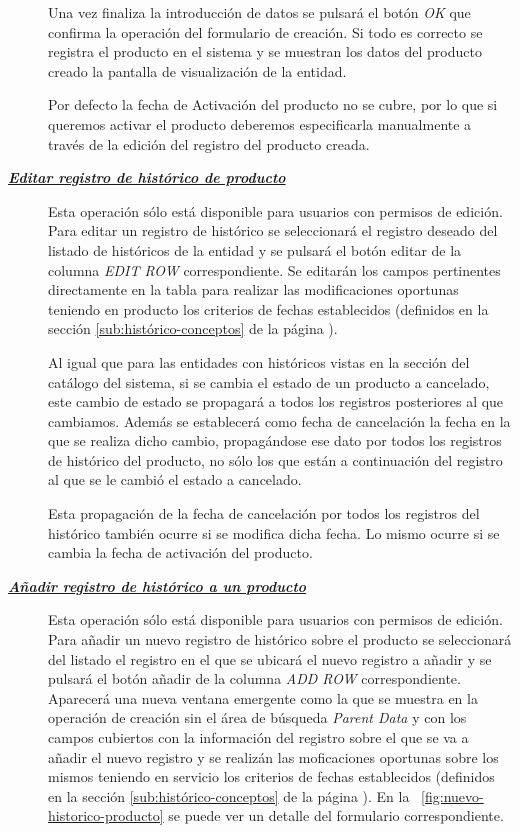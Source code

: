\begin{description}
Una vez finaliza la introducción de datos se pulsará el botón \emph{OK} que confirma la operación del formulario de creación. Si todo es correcto se registra el producto en el sistema y se muestran los datos del producto creado la pantalla de visualización de la entidad.

Por defecto la fecha de Activación del producto no se cubre, por lo que si queremos activar el producto deberemos especificarla manualmente a través de la edición del registro del producto creada.


\item[\underline{\textsl{\textbf{Editar registro de histórico de producto}}}] Esta operación sólo está disponible para usuarios con permisos de edición.
Para editar un registro de histórico se seleccionará el registro deseado del listado de históricos de la entidad y se pulsará el botón editar de la columna \textit{EDIT ROW} correspondiente. Se editarán los campos pertinentes directamente en la tabla para realizar las modificaciones oportunas teniendo en producto los criterios de fechas establecidos (definidos en la sección \ref{sub:histórico-conceptos} de la página \pageref{sub:histórico-conceptos}).

Al igual que para las entidades con históricos vistas en la sección del catálogo del sistema, si se cambia el estado de un producto a cancelado, este cambio de estado se propagará a todos los registros posteriores al que cambiamos. Además se establecerá como fecha de cancelación la fecha en la que se realiza dicho cambio, propagándose ese dato por todos los registros de histórico del producto, no sólo los que están a continuación del registro al que se le cambió el estado a cancelado.

Esta propagación de la fecha de cancelación por todos los registros del histórico  también ocurre si se modifica dicha fecha. Lo mismo ocurre si se cambia la fecha de activación del producto.

\item[\underline{\textsl{\textbf{Añadir registro de histórico a un producto}}}] Esta operación sólo está disponible para usuarios con permisos de edición.
Para añadir un nuevo registro de histórico sobre el producto se seleccionará del listado el registro en el que se ubicará el nuevo registro a añadir y se pulsará el botón añadir de la columna \textit{ADD ROW} correspondiente. Aparecerá una nueva ventana emergente como la que se muestra en la operación de creación sin el área de búsqueda \emph{Parent Data} y con los campos cubiertos con la información del registro sobre el que se va a añadir el nuevo registro y se realizán las moficaciones oportunas sobre los mismos teniendo en servicio los criterios de fechas establecidos (definidos en la sección \ref{sub:histórico-conceptos} de la página \pageref{sub:histórico-conceptos}). En la \figurename~\ref{fig:nuevo-historico-producto} se puede ver un detalle del formulario correspondiente.


\end{description}
